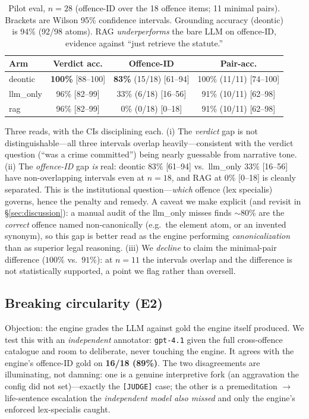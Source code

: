 \begin{table}[h]\centering
\begin{tabular}{lccc}
\toprule
Arm & Verdict acc. & Offence-ID & Pair-acc.\\
\midrule
deontic   & \textbf{100\%} [88--100] & \textbf{83\%} (15/18) [61--94] & 100\% (11/11) [74--100]\\
llm\_only  & 96\% [82--99]  & 33\% (6/18) [16--56]  & 91\% (10/11) [62--98]\\
rag       & 96\% [82--99]  & 0\% (0/18) [0--18]    & 91\% (10/11) [62--98]\\
\bottomrule
\end{tabular}
\caption{Pilot eval, $n{=}28$ (offence-ID over the 18 offence items; 11 minimal pairs).
Brackets are Wilson 95\% confidence intervals. Grounding accuracy (deontic) is 94\%
(92/98 atoms). RAG \emph{underperforms} the bare LLM on offence-ID, evidence against
``just retrieve the statute.''}
\label{tab:e1}
\end{table}

Three reads, with the CIs disciplining each. (i) The \emph{verdict} gap is not
distinguishable---all three intervals overlap heavily---consistent with the verdict
question (``was a crime committed'') being nearly guessable from narrative tone. (ii)
The \emph{offence-ID} gap \emph{is} real: deontic $83\%$ [61--94] vs.\ llm\_only $33\%$
[16--56] have non-overlapping intervals even at $n{=}18$, and RAG at $0\%$ [0--18] is
cleanly separated. This is the institutional question---\emph{which} offence (lex
specialis) governs, hence the penalty and remedy. A caveat we make explicit (and
revisit in \S\ref{sec:discussion}): a manual audit of the llm\_only misses finds
$\sim$80\% are the \emph{correct} offence named non-canonically (e.g.\ the element
atom, or an invented synonym), so this gap is better read as the engine performing
\emph{canonicalization} than as superior legal reasoning. (iii) We \emph{decline} to claim the
minimal-pair difference ($100\%$ vs.\ $91\%$): at $n{=}11$ the intervals overlap and the
difference is not statistically supported, a point we flag rather than oversell.

\subsection{Breaking circularity (E2)}
Objection: the engine grades the LLM against gold the engine itself produced. We
test this with an \emph{independent} annotator: \texttt{gpt-4.1} given the full
cross-offence catalogue and room to deliberate, never touching the engine. It agrees
with the engine's offence-ID gold on \textbf{16/18 (89\%)}. The two disagreements are
illuminating, not damning: one is a genuine interpretive fork (an aggravation the
config did not set)---exactly the \texttt{[JUDGE]} case; the other is a premeditation
$\rightarrow$ life-sentence escalation the \emph{independent model also missed} and
only the engine's enforced lex-specialis caught.

